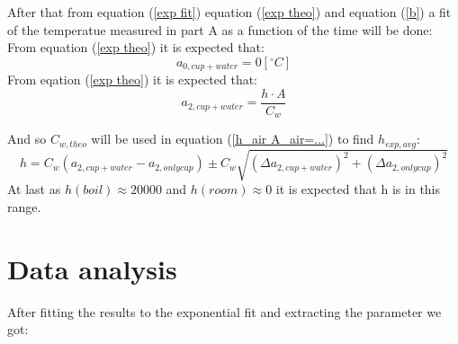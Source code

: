 \documentclass[12pt,a4paper]{report}
\begin{document}
After that from equation (\eqref{exp fit}) equation (\eqref{exp theo}) and equation (\eqref{b}) a fit of the temperatue measured in part A as a function of the time will be done:
From equation (\eqref{exp theo}) it is expected that:
$$a_{0,cup + water} = 0[^\circ C]$$
From eqation (\eqref{exp theo}) it is expected that:
$$a_{2, cup + water} = \frac{h\cdot A}{C_w}$$

And so $C_{w, theo}$ will be used in equation (\eqref{h_air A_air=...}) to find $h_{exp, avg}$:
\begin{equation}
    h = C_w(a_{2, cup+water}-a_{2, onlycup}) \pm C_w\sqrt{(\Delta a_{2, cup+water})^2+(\Delta a_{2, onlycup})^2}
\end{equation}
At last as $h(boil)\approx 20000$ and $h(room) \approx 0$ it is expected that h is in this range.


\pagebreak
\section{Data analysis}
After fitting the results to the exponential fit and extracting the parameter we got: 
\end{document}
